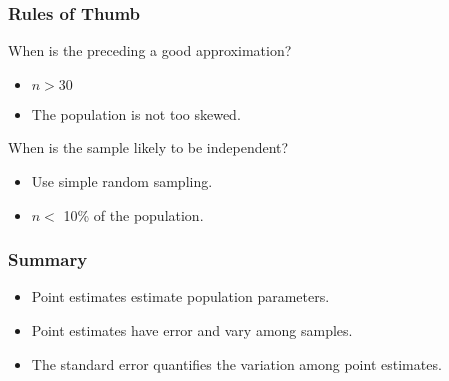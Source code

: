 \begin{frame}
  \frametitle{Rules of Thumb}

  When is the preceding a good approximation?

  \begin{itemize}
  \item $n>30$
  \item The population is not too skewed.
  \end{itemize}

  When is the sample likely to be independent?

  \begin{itemize}
  \item Use simple random sampling.
  \item $n < $ 10\% of the population.
  \end{itemize}

  \cnote{

  }
\end{frame}

\begin{frame}
  \frametitle{Summary}

  \begin{itemize}
  \item Point estimates estimate population parameters.
  \item Point estimates have error and vary among samples.
  \item The standard error quantifies the variation among point estimates.
  \end{itemize}

  \cnote{

  }
\end{frame}

